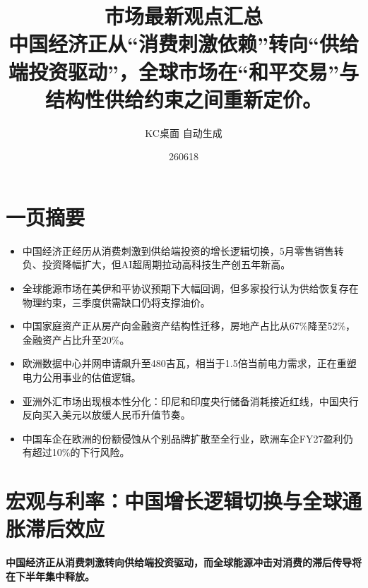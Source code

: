 \documentclass[11pt]{ctexart}
\title{\textbf{市场最新观点汇总}\\[0.4em]{\large 中国经济正从“消费刺激依赖”转向“供给端投资驱动”，全球市场在“和平交易”与结构性供给约束之间重新定价。}}
\author{KC桌面 自动生成}
\date{260618}
\begin{document}
\maketitle
\tableofcontents
\newpage
\section{一页摘要}
\begin{itemize}
  \item 中国经济正经历从消费刺激到供给端投资的增长逻辑切换，5月零售销售转负、投资降幅扩大，但AI超周期拉动高科技生产创五年新高。
  \item 全球能源市场在美伊和平协议预期下大幅回调，但多家投行认为供给恢复存在物理约束，三季度供需缺口仍将支撑油价。
  \item 中国家庭资产正从房产向金融资产结构性迁移，房地产占比从67\%降至52\%，金融资产占比升至20\%。
  \item 欧洲数据中心并网申请飙升至480吉瓦，相当于1.5倍当前电力需求，正在重塑电力公用事业的估值逻辑。
  \item 亚洲外汇市场出现根本性分化：印尼和印度央行储备消耗接近红线，中国央行反向买入美元以放缓人民币升值节奏。
  \item 中国车企在欧洲的份额侵蚀从个别品牌扩散至全行业，欧洲车企FY27盈利仍有超过10\%的下行风险。
\end{itemize}
\section{宏观与利率：中国增长逻辑切换与全球通胀滞后效应}
\textbf{中国经济正从消费刺激转向供给端投资驱动，而全球能源冲击对消费的滞后传导将在下半年集中释放。}
\end{document}
